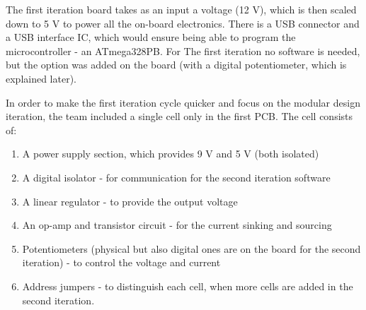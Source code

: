 The first iteration board takes as an input a voltage (12 V), which
is then scaled down to 5 V to power all the on-board electronics. 
There is a USB connector and a USB interface IC, which would ensure 
being able to program the microcontroller - an ATmega328PB. For The
first iteration no software is needed, but the option was added on the 
board (with a digital potentiometer, which is explained later).

In order to make the first iteration cycle quicker and focus on 
the modular design iteration, the team included a single cell 
only in the first PCB. The cell consists of:
\begin{enumerate}
    \item A power supply section, which provides 9 V and 5 V 
    (both isolated)
    \item A digital isolator - for communication for the second 
    iteration software
    \item A linear regulator - to provide the output voltage
    \item An op-amp and transistor circuit - for the current 
    sinking and sourcing
    \item Potentiometers (physical but also digital ones are on 
    the board for the second iteration) - to control the voltage
    and current
    \item Address jumpers - to distinguish each cell, when more 
    cells are added in the second iteration.
\end{enumerate}
